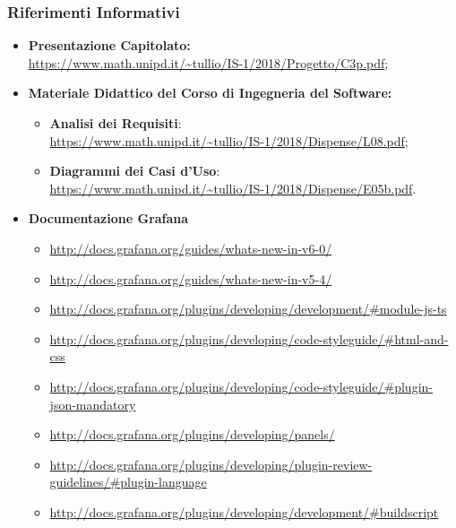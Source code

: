 \subsubsection{Riferimenti Informativi}
\begin{itemize}
\item \textbf{Presentazione Capitolato:}\\ \url{https://www.math.unipd.it/~tullio/IS-1/2018/Progetto/C3p.pdf};
\item \textbf{Materiale Didattico del Corso di Ingegneria del Software:}
	\begin{itemize}
	\item \textbf{Analisi dei Requisiti}:\\ \url{https://www.math.unipd.it/~tullio/IS-1/2018/Dispense/L08.pdf};
	\item \textbf{Diagrammi dei Casi d'Uso}:\\ \url{https://www.math.unipd.it/~tullio/IS-1/2018/Dispense/E05b.pdf}.
	\end{itemize}
\item \textbf{Documentazione Grafana}
	\begin{itemize}
		\item \url{http://docs.grafana.org/guides/whats-new-in-v6-0/}
		\item \url{http://docs.grafana.org/guides/whats-new-in-v5-4/}
		\item \url{http://docs.grafana.org/plugins/developing/development/#module-js-ts}
		\item \url{http://docs.grafana.org/plugins/developing/code-styleguide/#html-and-css}
		\item \url{http://docs.grafana.org/plugins/developing/code-styleguide/#plugin-json-mandatory}
		\item \url{http://docs.grafana.org/plugins/developing/panels/}
		\item \url{http://docs.grafana.org/plugins/developing/plugin-review-guidelines/#plugin-language}
		\item \url{http://docs.grafana.org/plugins/developing/development/#buildscript}
	\end{itemize}
\end{itemize}
